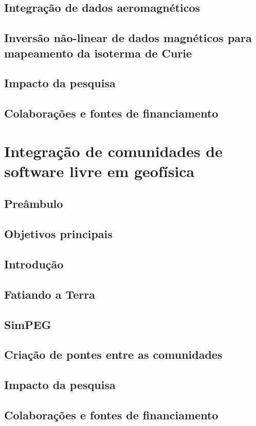 \documentclass[11pt,a4paper,oneside]{book}
\begin{document}

\section{Integração de dados aeromagnéticos}

\section{Inversão não-linear de dados magnéticos para mapeamento da isoterma de Curie}

\section{Impacto da pesquisa}

\section{Colaborações e fontes de financiamento}


\chapter{Integração de comunidades de software livre em geofísica}

\section{Preâmbulo}

\section{Objetivos principais}

\section{Introdução}

\section{Fatiando a Terra}

\section{SimPEG}

\section{Criação de pontes entre as comunidades}

\section{Impacto da pesquisa}

\section{Colaborações e fontes de financiamento}

\backmatter


\end{document}
